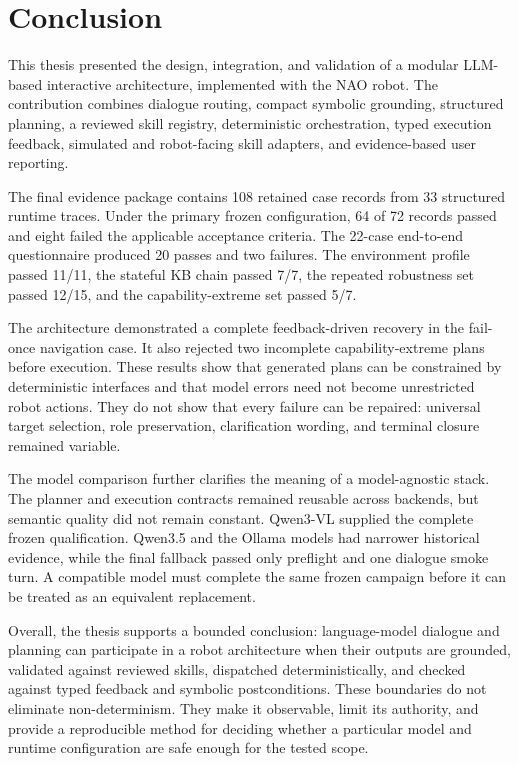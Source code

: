 \chapter{Conclusion}
\label{chap:conclusion}

This thesis presented the design, integration, and validation of a modular LLM-based interactive architecture, implemented with the NAO robot. The contribution combines dialogue routing, compact symbolic grounding, structured planning, a reviewed skill registry, deterministic orchestration, typed execution feedback, simulated and robot-facing skill adapters, and evidence-based user reporting.

The final evidence package contains 108 retained case records from 33 structured runtime traces. Under the primary frozen configuration, 64 of 72 records passed and eight failed the applicable acceptance criteria. The 22-case end-to-end questionnaire produced 20 passes and two failures. The environment profile passed 11/11, the stateful KB chain passed 7/7, the repeated robustness set passed 12/15, and the capability-extreme set passed 5/7.

The architecture demonstrated a complete feedback-driven recovery in the fail-once navigation case. It also rejected two incomplete capability-extreme plans before execution. These results show that generated plans can be constrained by deterministic interfaces and that model errors need not become unrestricted robot actions. They do not show that every failure can be repaired: universal target selection, role preservation, clarification wording, and terminal closure remained variable.

The model comparison further clarifies the meaning of a model-agnostic stack. The planner and execution contracts remained reusable across backends, but semantic quality did not remain constant. Qwen3-VL supplied the complete frozen qualification. Qwen3.5 and the Ollama models had narrower historical evidence, while the final  fallback passed only preflight and one dialogue smoke turn. A compatible model must complete the same frozen campaign before it can be treated as an equivalent replacement.

Overall, the thesis supports a bounded conclusion: language-model dialogue and planning can participate in a robot architecture when their outputs are grounded, validated against reviewed skills, dispatched deterministically, and checked against typed feedback and symbolic postconditions. These boundaries do not eliminate non-determinism. They make it observable, limit its authority, and provide a reproducible method for deciding whether a particular model and runtime configuration are safe enough for the tested scope.
